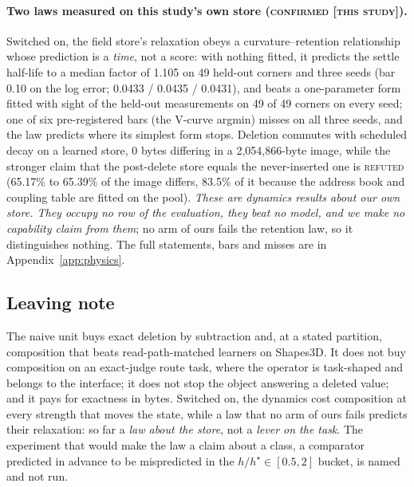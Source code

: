 \documentclass{article} %
\begin{document}
\paragraph{Two laws measured on this study's own store (\textsc{confirmed [this study]}).}
Switched on, the field store's relaxation obeys a curvature--retention relationship whose
prediction is a \emph{time}, not a score: with nothing fitted, it predicts the settle half-life to
a median factor of 1.105 on 49 held-out corners and three seeds (bar 0.10 on the log error; 0.0433
/ 0.0435 / 0.0431), and beats a one-parameter form fitted with sight of the held-out measurements
on 49 of 49 corners on every seed; one of six pre-registered bars (the V-curve argmin) misses on
all three seeds, and the law predicts where its simplest form stops.
Deletion commutes with scheduled decay on a learned store, 0 bytes differing in a 2,054,866-byte
image, while the stronger claim that the post-delete store equals the never-inserted one is
\textsc{refuted} (65.17\% to 65.39\% of the image differs, 83.5\% of it because the address book
and coupling table are fitted on the pool). %
\emph{These are dynamics results about our own store. They occupy no row of the evaluation, they
beat no model, and we make no capability claim from them}; no arm of ours fails the retention law,
so it distinguishes nothing. The full statements, bars and misses are in
Appendix~\ref{app:physics}.

\subsection{Leaving note}
\label{sec:leaving}

The naive unit buys exact deletion by subtraction and, at a stated partition, composition that
beats read-path-matched learners on Shapes3D. It does not buy composition on an exact-judge route task, where the operator is
task-shaped and belongs to the interface; it does not stop the object answering a deleted value;
and it pays for exactness in bytes. Switched on, the dynamics cost composition at every strength
that moves the state, while a law that no arm of ours fails predicts their relaxation: so far a
\emph{law about the store}, not a \emph{lever on the task}. The experiment that would make the law a
claim about a class, a comparator predicted in advance to be mispredicted in the
$h/h^\star\in[0.5,2]$ bucket, is named and not run. %
\end{document}
